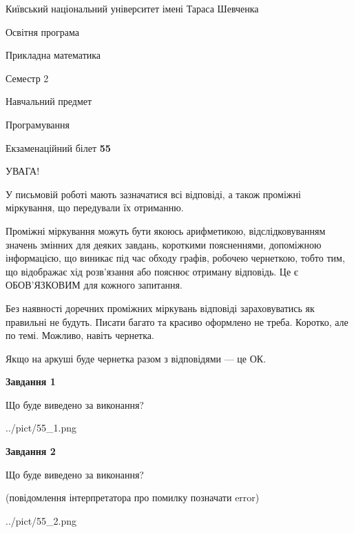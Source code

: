 \documentclass[12pt, ukrainian]{article}
\begin{document}
{{\begin {small}\par
{ \center  Київський національний університет імені Тараса Шевченка \par}
{\parbox {5 cm}{Освітня програма \hfill}{\parbox {7 cm}{Прикладна математика\hfill}}\parbox {6 cm}{\hfill Семестр 2}}\par
{\parbox {5 cm} {Навчальний предмет \hfill}\parbox {7 cm}{Програмування \hfill}\parbox {6cm}{\hfill}\par}\vspace{-7pt} \end{small}}{\center Екзаменаційний білет \No \textbf
{ 55 }\par}}
{
\begin {large}
УВАГА!

У письмовій роботі мають зазначатися всі відповіді, а також проміжні міркування, що передували їх отриманню.

Проміжні міркування можуть бути якоюсь арифметикою, відслідковуванням зна\-чень змінних для деяких завдань,
короткими поясненнями, допоміжною інформацією, що виникає під час обходу графів, робочею чернеткою,
тобто тим, що відображає хід розв’язання або пояснює отриману відповідь.
Це є ОБОВ’ЯЗКОВИМ для кожного запитання.

Без наявності доречних проміжних міркувань відповіді зараховуватись як правиль\-ні не будуть.
Писати багато та красиво оформлено не треба. Коротко, але по темі. Можли\-во, навіть чернетка.

Якщо на аркуші буде чернетка разом з відповідями --- це ОК.

\newpage

{\begin {center}\textbf{Завдання 1}\end {center}}\par
Що буде виведено за виконання?\par
\begin{center}
	{../pict/55_1.png}
\end{center}
\newpage

{\begin {center}\textbf{Завдання 2}\end {center}}\par
Що буде виведено за виконання?\par
 (повідомлення інтерпретатора про помилку позначати error)\par
\begin{center}
	{../pict/55_2.png}
\end{center}
\newpage


\end{large}}
\end{document}

